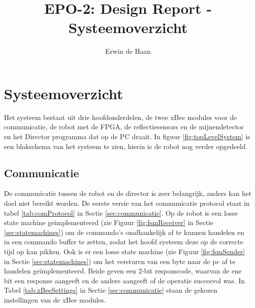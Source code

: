 \documentclass{report}
\title{EPO-2: Design Report - Systeemoverzicht}
\author{Erwin de Haan}
\begin{document}
\chapter{Systeemoverzicht}
\label{ch:systeem}
Het systeem bestaat uit drie hoofdonderdelen, de twee xBee modules voor de communicatie, de robot met de FPGA, de reflectiesensors en de mijnendetector en het Director programma dat op de PC draait.
In figuur \ref{fig:topLevelSystem} is een blokschema van het systeem te zien, hierin is de robot nog verder opgedeeld. 
\section{Communicatie}
De communicatie tussen de robot en de director is zeer belangrijk, anders kan het doel niet bereikt worden.
De eerste versie van het communicatie protocol staat in tabel \ref{tab:comProtocol} in Sectie \ref{sec:communicatie}.
Op de robot is een losse state machine geïmplementeerd (zie Figuur \ref{fig:fsmReceiver} in Sectie \ref{sec:statemachines}) om de commando's onafhankelijk af te kunnen handelen en in een commando buffer te zetten, zodat het hoofd systeem deze op de correcte tijd op kan pikken.
Ook is er een losse state machine (zie Figuur \ref{fig:fsmSender} in Sectie \ref{sec:statemachines}) om het versturen van een byte naar de pc af te handelen geïmplementeerd.
Beide geven een 2-bit responscode, waarvan de ene bit een response aangeeft en de andere aangeeft of de operatie succesvol was.
In Tabel \ref{tab:xBeeSettings} in Sectie \ref{sec:communicatie} staan de gekozen instellingen van de xBee modules.
\end{document}
